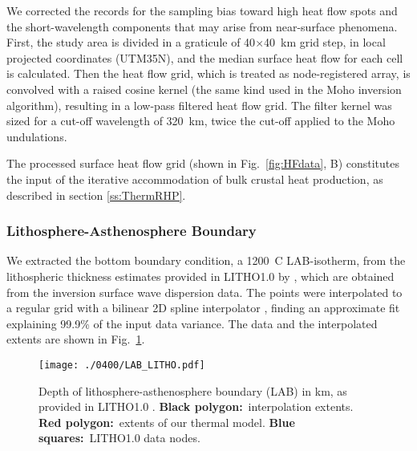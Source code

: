 {We corrected the records for the sampling bias toward high heat flow spots \parencite{Mareschal2013} and the short-wavelength components that may arise from near-surface phenomena.
First, the study area is divided in a graticule of \num{40}$\times$\SI{40}{\kilo \metre} grid step, in local projected coordinates (UTM35N), and the median surface heat flow for each cell is calculated.
Then the heat flow grid, which is treated as node-registered array, is convolved with a raised cosine kernel (the same kind used in the Moho inversion algorithm), resulting in a low-pass filtered heat flow grid.
The filter kernel was sized for a cut-off wavelength of \SI{320}{\kilo \metre}, twice the cut-off applied to the Moho undulations.

The processed surface heat flow grid (shown in Fig.~\ref{fig:HFdata}, B) constitutes the input of the iterative accommodation of bulk crustal heat production, as described in section \ref{ss:ThermRHP}.

\subsubsection{Lithosphere-Asthenosphere Boundary}
\label{sss:ThermInputLAB}

We extracted the bottom boundary condition, a 1200~\textdegree C LAB-isotherm, from the lithospheric thickness estimates provided in LITHO1.0 by \textcite{Pasyanos2014}, which are obtained from the inversion surface wave dispersion data.
The points were interpolated to a regular grid with a bilinear 2D spline interpolator \parencite{Wessel2009}, finding an approximate fit explaining 99.9\% of the input data variance.
The data and the interpolated extents are shown in Fig.~\ref{fig:LAB}.

\begin{figure}
	\begin{adjustbox}{center}
	\texttt{[image: ./0400/LAB\_LITHO.pdf]}
	\end{adjustbox}
	\caption{Depth of lithosphere-asthenosphere boundary (LAB) in km, as provided in LITHO1.0 \parencite{Pasyanos2014}. \textbf{Black polygon:}~interpolation extents. \textbf{Red polygon:}~extents of our thermal model. \textbf{Blue squares:}~LITHO1.0 data nodes.}
	\label{fig:LAB}
\end{figure}

}
